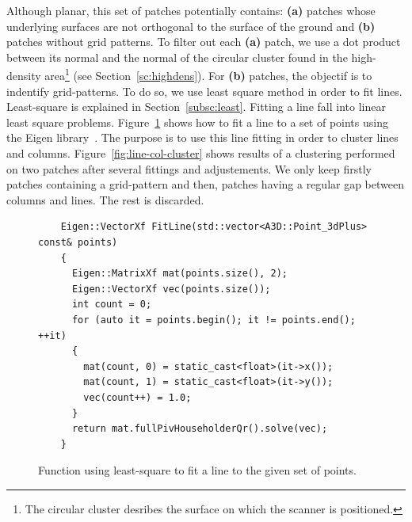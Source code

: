 Although planar, this set of patches potentially contains: \textbf{(a)} patches whose underlying surfaces are not orthogonal to the surface of the ground and \textbf{(b)} patches without grid patterns. To filter out each \textbf{(a)} patch, we use a dot product between its normal and the normal of the circular cluster found in the high-density area\footnote{The circular cluster desribes the surface on which the scanner is positioned.} (see Section~\ref{sc:highdens}). For \textbf{(b)} patches,
the objectif is to indentify grid-patterns. To do so, we use least square method in order to fit lines. Least-square is explained in Section~\ref{subsc:least}. Fitting a line fall into linear least square problems. Figure~\ref{fig:fitline} shows how to fit a line to a set of points using the Eigen library~\cite{eigenweb}. The purpose is to use this line fitting in order to cluster lines and columns. Figure~\ref{fig:line-col-cluster} shows results of a clustering performed on two patches after several fittings and adjustements. We only keep firstly patches containing a grid-pattern and then, patches having a regular gap between columns and lines. The rest is discarded.

\begin{figure}
  \centering
  \begin{lstlisting}
    Eigen::VectorXf FitLine(std::vector<A3D::Point_3dPlus> const& points)
    {
      Eigen::MatrixXf mat(points.size(), 2);
      Eigen::VectorXf vec(points.size());
      int count = 0;
      for (auto it = points.begin(); it != points.end(); ++it)
      {
        mat(count, 0) = static_cast<float>(it->x());
        mat(count, 1) = static_cast<float>(it->y());
        vec(count++) = 1.0;
      }
      return mat.fullPivHouseholderQr().solve(vec);
    }
  \end{lstlisting}
  \caption{Function using least-square to fit a line to the given set of points.}
  \label{fig:fitline}
\end{figure}

